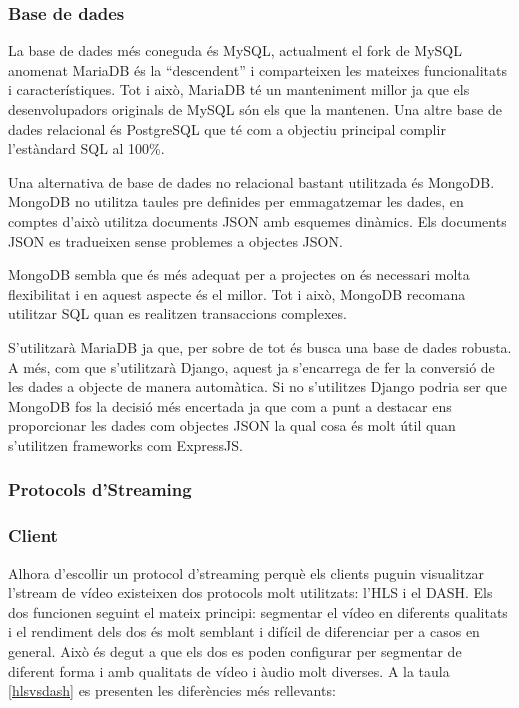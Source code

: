 \documentclass[12pt, titlepage]{article}
\begin{document}
\subsubsection{Base de dades}
La base de dades més coneguda és MySQL, actualment el fork de MySQL anomenat MariaDB
és la “descendent” i comparteixen les mateixes funcionalitats i característiques. Tot i això, MariaDB
té un manteniment millor ja que els desenvolupadors originals de MySQL són els que la
mantenen.
Una altre base de dades relacional és PostgreSQL que té com a objectiu principal complir
l’estàndard SQL al 100\%.

Una alternativa de base de dades no relacional bastant utilitzada és MongoDB.
MongoDB no utilitza taules pre definides per emmagatzemar les dades, en comptes
d’això utilitza documents JSON amb esquemes dinàmics. Els documents JSON es
tradueixen sense problemes a objectes JSON.

MongoDB sembla que és més adequat per a projectes on és necessari molta flexibilitat
i en aquest aspecte és el millor. Tot i això, MongoDB recomana utilitzar SQL quan
es realitzen transaccions complexes.

S’utilitzarà MariaDB ja que, per sobre de tot és busca una base de dades robusta.
A més, com que s’utilitzarà Django, aquest ja s’encarrega de fer la conversió de
les dades a objecte de manera automàtica. Si no s’utilitzes Django podria ser que
MongoDB fos la decisió més encertada ja que com a punt a destacar ens proporcionar
les dades com objectes JSON la qual cosa és molt útil quan s’utilitzen frameworks
com ExpressJS.


\subsubsection{Protocols d'Streaming}

\subsubsection{Client}

Alhora d'escollir un protocol d'streaming perquè els clients puguin visualitzar
l'stream de vídeo existeixen dos protocols molt utilitzats: l'HLS i el DASH. Els
dos funcionen seguint el mateix principi: segmentar el vídeo en diferents qualitats
i el rendiment dels dos és molt semblant i difícil de diferenciar per a casos
en general. Això és degut a que els dos es poden configurar per segmentar de
diferent forma i amb qualitats de vídeo i àudio molt diverses. A la taula \ref{hlsvsdash}
es presenten les diferències més rellevants:
\end{document}
